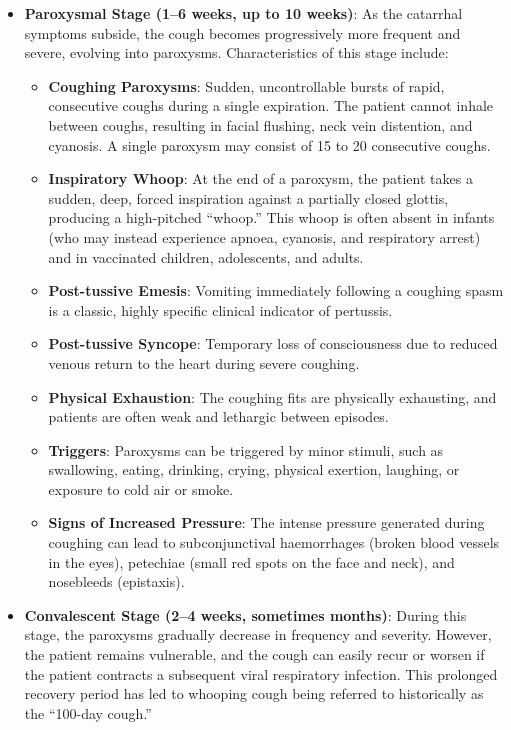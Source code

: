 \begin{itemize}
    \item \textbf{Paroxysmal Stage (1--6 weeks, up to 10 weeks)}: As the catarrhal symptoms subside, the cough becomes progressively more frequent and severe, evolving into paroxysms. Characteristics of this stage include:
    \begin{itemize}
        \item \textbf{Coughing Paroxysms}: Sudden, uncontrollable bursts of rapid, consecutive coughs during a single expiration. The patient cannot inhale between coughs, resulting in facial flushing, neck vein distention, and cyanosis. A single paroxysm may consist of 15 to 20 consecutive coughs.
        \item \textbf{Inspiratory Whoop}: At the end of a paroxysm, the patient takes a sudden, deep, forced inspiration against a partially closed glottis, producing a high-pitched ``whoop.'' This whoop is often absent in infants (who may instead experience apnoea, cyanosis, and respiratory arrest) and in vaccinated children, adolescents, and adults.
        \item \textbf{Post-tussive Emesis}: Vomiting immediately following a coughing spasm is a classic, highly specific clinical indicator of pertussis.
        \item \textbf{Post-tussive Syncope}: Temporary loss of consciousness due to reduced venous return to the heart during severe coughing.
        \item \textbf{Physical Exhaustion}: The coughing fits are physically exhausting, and patients are often weak and lethargic between episodes.
        \item \textbf{Triggers}: Paroxysms can be triggered by minor stimuli, such as swallowing, eating, drinking, crying, physical exertion, laughing, or exposure to cold air or smoke.
        \item \textbf{Signs of Increased Pressure}: The intense pressure generated during coughing can lead to subconjunctival haemorrhages (broken blood vessels in the eyes), petechiae (small red spots on the face and neck), and nosebleeds (epistaxis).
    \end{itemize}

    \item \textbf{Convalescent Stage (2--4 weeks, sometimes months)}: During this stage, the paroxysms gradually decrease in frequency and severity. However, the patient remains vulnerable, and the cough can easily recur or worsen if the patient contracts a subsequent viral respiratory infection. This prolonged recovery period has led to whooping cough being referred to historically as the ``100-day cough.''
\end{itemize}

